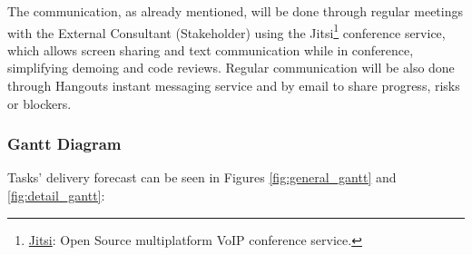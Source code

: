 The communication, as already mentioned, will be done through regular meetings with the External Consultant (Stakeholder) using the Jitsi\footnote{\href{https://jitsi.org/}{Jitsi}: Open Source multiplatform VoIP conference service.} conference service, which allows screen sharing and text communication while in conference, simplifying demoing and code reviews. Regular communication will be also done through Hangouts instant messaging service and by email to share progress, risks or blockers.

\subsubsection{Gantt Diagram}
Tasks' delivery forecast can be seen in Figures  \ref{fig:general_gantt} and \ref{fig:detail_gantt}:

